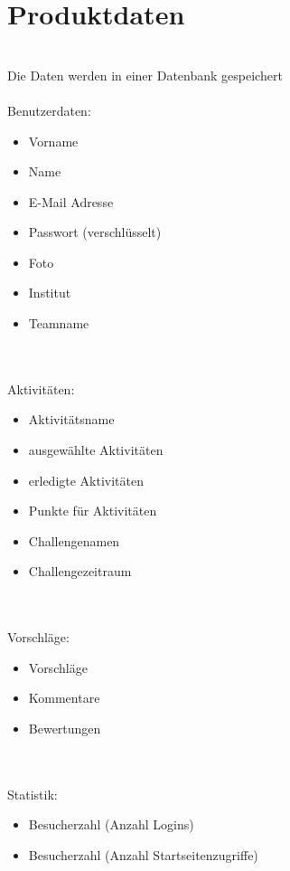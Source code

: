 \section{Produktdaten}\\
Die Daten werden in einer Datenbank gespeichert \\
\\
Benutzerdaten: \\
\begin{itemize}\\
\item Vorname\\
\item Name\\
\item E-Mail Adresse\\
\item Passwort (verschlüsselt)\\
\item Foto\\
\item Institut\\
\item Teamname\\
\end{itemize}\\
\\
Aktivitäten: \\
\begin{itemize}\\
\item Aktivitätsname\\
\item ausgewählte Aktivitäten\\
\item erledigte Aktivitäten\\
\item Punkte für Aktivitäten\\
\item Challengenamen\\
\item Challengezeitraum\\
\end{itemize}\\
\\
Vorschläge:\\
\begin{itemize}\\
\item Vorschläge\\
\item Kommentare\\
\item Bewertungen\\
\end{itemize}\\
\\
Statistik:\\
\begin{itemize}\\
\item Besucherzahl (Anzahl Logins)\\
\item Besucherzahl (Anzahl Startseitenzugriffe)\\
\end{itemize}\\
\\




